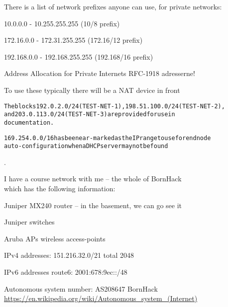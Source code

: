 \documentclass[Screen16to9,17pt]{foils}
\begin{document}

\begin{list1}
\item There is a list of network prefixes anyone can use, for private networks:
\begin{list2}
\item 10.0.0.0    -  10.255.255.255  (10/8 prefix)
\item 172.16.0.0  -  172.31.255.255  (172.16/12 prefix)
\item 192.168.0.0 -  192.168.255.255 (192.168/16 prefix)
\end{list2}
\item Address Allocation for Private Internets RFC-1918 adresserne!
\item To use these typically there will be a NAT device in front
\end{list1}

\begin{alltt}
The blocks 192.0.2.0/24 (TEST-NET-1), 198.51.100.0/24 (TEST-NET-2),
and 203.0.113.0/24 (TEST-NET-3) are provided for use in
documentation.

169.254.0.0/16 has been ear-marked as the IP range to use for end node
auto-configuration when a DHCP server may not be found
\end{alltt}



.

\begin{list1}
\item I have a course network with me -- the whole of BornHack \smiley\\
which has the following information:
\begin{list2}
\item Juniper MX240 router -- in the basement, we can go see it
\item Juniper switches
\item Aruba APs wireless access-points
\item IPv4 addresses: 151.216.32.0/21 total 2048
\item IPv6 addresses route6: 2001:678:9ec::/48
\item Autonomous system number: AS208647 BornHack\\
\url{https://en.wikipedia.org/wiki/Autonomous_system_(Internet)}

\end{list2}
\end{list1}
\end{document}
